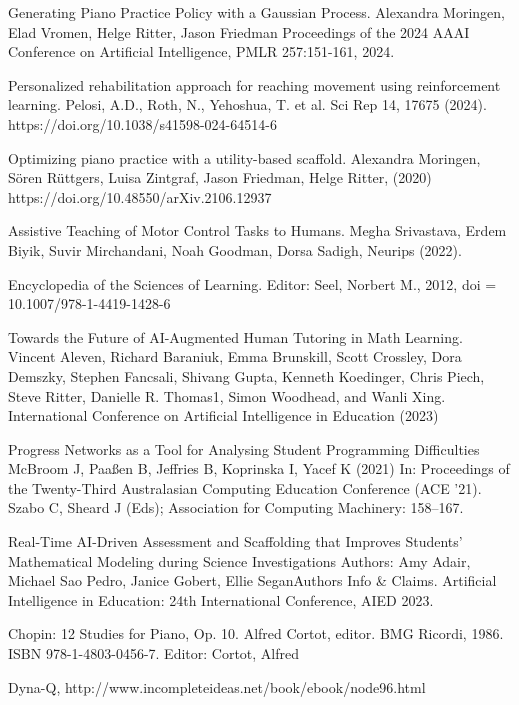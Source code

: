 \documentclass{article}
\begin{document}

\begin{thebibliography}{9}
Generating Piano Practice Policy with a Gaussian Process.
Alexandra Moringen, Elad Vromen, Helge Ritter, Jason Friedman Proceedings of the 2024 AAAI Conference on Artificial Intelligence, PMLR 257:151-161, 2024. 

Personalized rehabilitation approach for reaching movement using reinforcement learning. Pelosi, A.D., Roth, N., Yehoshua, T. et al.  Sci Rep 14, 17675 (2024). https://doi.org/10.1038/s41598-024-64514-6

Optimizing piano practice with a utility-based scaffold.
Alexandra Moringen, Sören Rüttgers, Luisa Zintgraf, Jason Friedman, Helge Ritter,  (2020)	https://doi.org/10.48550/arXiv.2106.12937

Assistive Teaching of Motor Control Tasks to Humans.
Megha Srivastava, Erdem Biyik, Suvir Mirchandani, Noah Goodman, Dorsa Sadigh, Neurips (2022).

Encyclopedia of the Sciences of Learning.
Editor: Seel, Norbert M., 2012,  doi = {10.1007/978-1-4419-1428-6}  

Towards the Future of AI-Augmented Human
Tutoring in Math Learning.
Vincent Aleven, Richard Baraniuk, Emma Brunskill, Scott Crossley,
Dora Demszky, Stephen Fancsali, Shivang Gupta, Kenneth Koedinger,
Chris Piech, Steve Ritter, Danielle R. Thomas1, Simon Woodhead,
and Wanli Xing. International Conference on Artificial Intelligence in Education (2023)

Progress Networks as a Tool for Analysing Student Programming Difficulties
McBroom J, Paaßen B, Jeffries B, Koprinska I, Yacef K (2021)
In: Proceedings of the Twenty-Third Australasian Computing Education Conference (ACE '21). Szabo C, Sheard J (Eds); Association for Computing Machinery: 158–167.

Real-Time AI-Driven Assessment and Scaffolding that Improves Students’ Mathematical Modeling during Science Investigations
Authors: Amy Adair, Michael Sao Pedro, Janice Gobert, Ellie SeganAuthors Info \& Claims. Artificial Intelligence in Education: 24th International Conference, AIED 2023.

Chopin: 12 Studies for Piano, Op. 10. Alfred Cortot, editor. BMG Ricordi, 1986. ISBN
978-1-4803-0456-7. Editor: Cortot, Alfred

Dyna-Q, http://www.incompleteideas.net/book/ebook/node96.html
\end{thebibliography}
\end{document}

